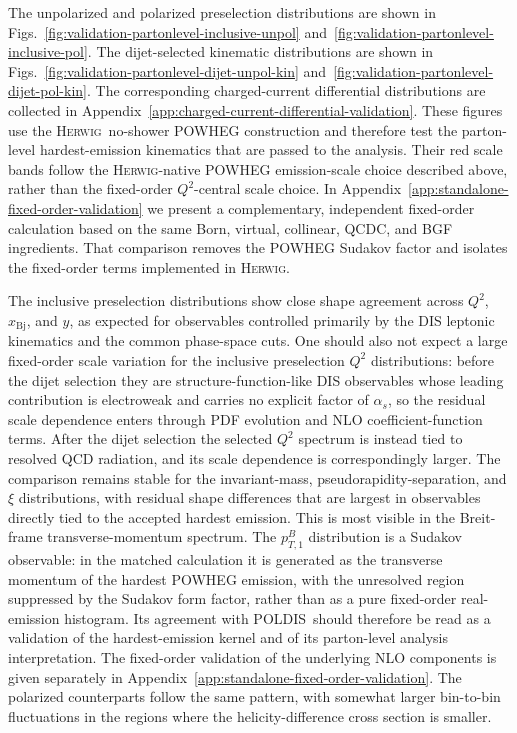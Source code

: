 \documentclass[a4paper,11pt]{article}
\newcommand{\Herwig}{\textsc{Herwig}}
\newcommand{\POLDIS}{\textsc{POLDIS}}
\begin{document}
The unpolarized and polarized preselection distributions are shown in
Figs.~\ref{fig:validation-partonlevel-inclusive-unpol}
and~\ref{fig:validation-partonlevel-inclusive-pol}. The dijet-selected
kinematic distributions are shown in
Figs.~\ref{fig:validation-partonlevel-dijet-unpol-kin}
and~\ref{fig:validation-partonlevel-dijet-pol-kin}. The corresponding
charged-current differential distributions are collected in
Appendix~\ref{app:charged-current-differential-validation}.
These figures use the \Herwig\ no-shower POWHEG construction and therefore
test the parton-level hardest-emission kinematics that are passed to the
analysis.  Their red scale bands follow the \Herwig-native POWHEG emission-scale
choice described above, rather than the fixed-order $Q^2$-central scale choice.
In Appendix~\ref{app:standalone-fixed-order-validation} we present a
complementary, independent fixed-order calculation based on the same Born,
virtual, collinear, QCDC, and BGF ingredients.  That comparison removes the
POWHEG Sudakov factor and isolates the fixed-order terms implemented in
\Herwig.

The inclusive preselection distributions show close shape agreement across
$Q^2$, $x_{\mathrm{Bj}}$, and $y$, as expected for observables controlled
primarily by the DIS leptonic kinematics and the common phase-space cuts. One
should also not expect a large fixed-order scale variation for the inclusive
preselection $Q^2$ distributions: before the dijet selection they are
structure-function-like DIS observables whose leading contribution is
electroweak and carries no explicit factor of $\alpha_s$, so the residual scale
dependence enters through PDF evolution and NLO coefficient-function terms. After
the dijet selection the selected $Q^2$ spectrum is instead tied to resolved QCD
radiation, and its scale dependence is correspondingly larger.  The comparison
remains stable for the invariant-mass,
pseudorapidity-separation, and $\xi$ distributions, with residual shape differences
that are largest in observables directly tied to the accepted hardest emission.
This is most visible in the Breit-frame transverse-momentum spectrum. The
$p_{T,1}^{B}$ distribution is a Sudakov observable: in the matched calculation
it is generated as the transverse momentum of the hardest POWHEG emission, with
the unresolved region suppressed by the Sudakov form factor, rather than as a
pure fixed-order real-emission histogram. Its agreement with \POLDIS\ should
therefore be read as a validation of the hardest-emission kernel and of its
parton-level analysis interpretation. The fixed-order validation of the
underlying NLO components is given separately in
Appendix~\ref{app:standalone-fixed-order-validation}. The polarized
counterparts follow the same pattern, with somewhat larger bin-to-bin
fluctuations in the regions where the helicity-difference cross section is
smaller.
\end{document}
